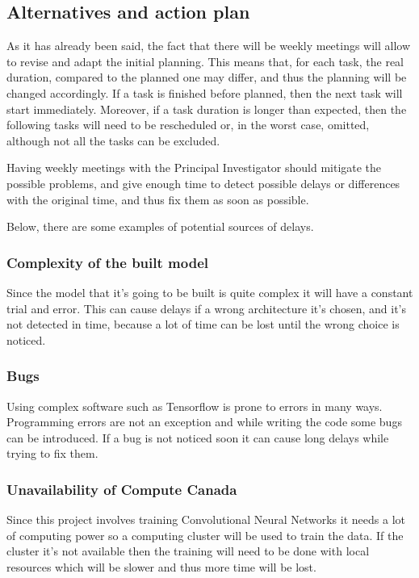 \subsection{Alternatives and action plan}

As it has already been said, the fact that there will be weekly meetings will allow to 
revise and adapt the initial planning. This means that, for each task, the real duration, 
compared to the planned one may differ, and thus the planning will be changed accordingly. 
If a task is finished before planned, then the next task will start immediately. 
Moreover, if a task duration is longer than expected, then the following tasks will need 
to be rescheduled or, in the worst case, omitted, although not all the tasks can be excluded.

Having weekly meetings with the Principal Investigator should mitigate the possible problems,
and give enough time to detect possible delays or differences with the original time, and
thus fix them as soon as possible.

Below, there are some examples of potential sources of delays.

\subsubsection{Complexity of the built model}

Since the model that it's going to be built is quite complex it will have a constant trial
and error. This can cause delays if a wrong architecture it's chosen, and it's not detected
in time, because a lot of time can be lost until the wrong choice is noticed. 

\subsubsection{Bugs}

Using complex software such as Tensorflow is prone to errors in many ways. Programming errors
are not an exception and while writing the code some bugs can be introduced. If a bug is not 
noticed soon it can cause long delays while trying to fix them.

\subsubsection{Unavailability of Compute Canada}

Since this project involves training Convolutional Neural Networks it needs a lot of computing 
power so a computing cluster will be used to train the data. If the cluster it's not available
then the training will need to be done with local resources which will be slower and thus 
more time will be lost.

